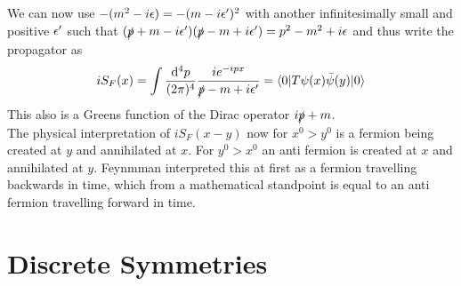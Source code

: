 We can now use $-(m^2 - i \epsilon) = -(m -i \epsilon')^2$ with another infinitesimally small and positive $\epsilon'$ such that $( \slashed p + m - i \epsilon')(\slashed p - m  + i \epsilon') = p^2 - m^2 + i \epsilon$ and thus write the propagator as
\[ i S_F(x) = \int \frac{{\rm d}^4 p}{(2\pi)^4} \frac{ i e^{-ipx}}{\slashed p - m + i \epsilon'} = \langle 0 | T \psi(x) \bar \psi(y) | 0 \rangle\]
This also is a Greens function of the Dirac operator $i \slashed p + m$.\\
The physical interpretation of $i S_F(x-y)$ now for $x^0 > y^0$ is a fermion being created at $y$ and annihilated at $x$. For $y^0 > x^0$ an anti fermion is created at $x$ and annihilated at $y$. Feynmman interpreted this at first as a fermion travelling backwards in time, which from a mathematical standpoint is equal to an anti fermion travelling forward in time.

\section{Discrete Symmetries}
